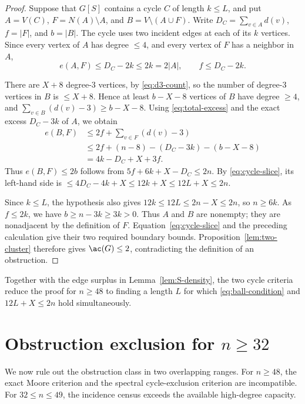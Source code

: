 \begin{proof}
Suppose that \(G[S]\) contains a cycle \(C\) of length \(k\le L\), and
put \(A=V(C)\), \(F=N(A)\setminus A\), and
\(B=V\setminus(A\cup F)\).  Write
\(D_C=\sum_{v\in A}d(v)\), \(f=|F|\), and \(b=|B|\).  The cycle uses two
incident edges at each of its \(k\) vertices.  Since every vertex of \(A\)
has degree \(\le4\), and every vertex of \(F\) has a neighbor in \(A\),
\begin{equation}\label{eq:cycle-slice}
  e(A,F)\le D_C-2k\le2k=2|A|,
  \qquad f\le D_C-2k.
\end{equation}

There are \(X+8\) degree-\(3\) vertices, by \eqref{eq:d3-count}, so the
number of degree-\(3\) vertices in \(B\) is \(\le X+8\).  Hence at least
\(b-X-8\) vertices of \(B\) have degree \(\ge4\), and
\(\sum_{v\in B}(d(v)-3)\ge b-X-8\).  Using
\eqref{eq:total-excess} and the exact excess \(D_C-3k\) of \(A\), we obtain
\[
\begin{aligned}
  e(B,F)
  &\le2f+\sum_{v\in F}(d(v)-3)\\
  &\le2f+(n-8)-(D_C-3k)-(b-X-8)\\
  &=4k-D_C+X+3f.
\end{aligned}
\]
Thus \(e(B,F)\le2b\) follows from \(5f+6k+X-D_C\le2n\).  By
\eqref{eq:cycle-slice}, its left-hand side is
\(\le4D_C-4k+X\le12k+X\le12L+X\le2n\).

Since \(k\le L\), the hypothesis also gives \(12k\le12L\le2n-X\le2n\),
so \(n\ge6k\).  As \(f\le2k\), we have
\(b\ge n-3k\ge3k>0\).  Thus \(A\) and \(B\) are nonempty; they are
nonadjacent by the definition of \(F\).  Equation~\eqref{eq:cycle-slice}
and the preceding calculation give their two required boundary bounds.
Proposition~\ref{lem:two-cluster} therefore gives \(\ac(G)\le2\),
contradicting the definition of an obstruction.
\end{proof}

Together with the edge surplus in Lemma~\ref{lem:S-density}, the two cycle
criteria reduce the proof for \(n\ge48\) to finding a length \(L\) for which
\eqref{eq:ball-condition} and \(12L+X\le2n\) hold simultaneously.

\section{Obstruction exclusion for \texorpdfstring{\(n\ge32\)}{n >= 32}}
\label{sec:obstruction-closure}

We now rule out the obstruction class in two overlapping ranges.  For
\(n\ge48\), the exact Moore criterion and the spectral cycle-exclusion
criterion are incompatible.  For \(32\le n\le49\), the incidence census
exceeds the available high-degree capacity.

